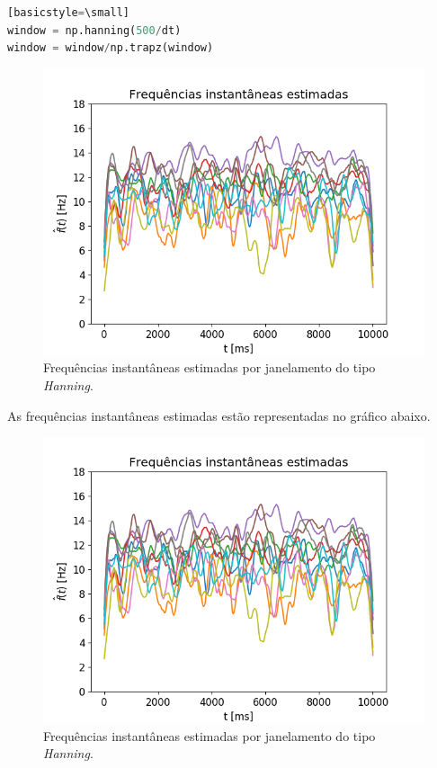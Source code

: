 \documentclass[12pt,letterpaper]{article}
\begin{document}
\begin{enumerate}[label=(\alph*)]
       \begin{lstlisting}[language=Python][basicstyle=\small]
window = np.hanning(500/dt)
window = window/np.trapz(window)
    \end{lstlisting}
        
        \begin{figure}[H]
            \centering
            \includegraphics[width=15cm]{TC2/images/inst_freqs.png}
            \caption{Frequências instantâneas estimadas por janelamento do tipo {\it Hanning}.}
            \label{fig:2}
        \end{figure}
    
    As frequências instantâneas estimadas estão representadas no gráfico abaixo.
    
        \begin{figure}[H]
            \centering
            \includegraphics[width=15cm]{TC2/images/inst_freqs.png}
            \caption{Frequências instantâneas estimadas por janelamento do tipo {\it Hanning}.}
            \label{fig:2}
        \end{figure}
    

\end{enumerate}
\end{document}
